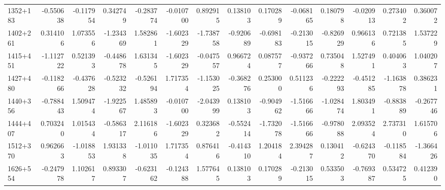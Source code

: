 \begin{tabular}{lrrrrrrrrrrrrr}
 1352+183 &  -0.550638 & -0.117954 &        0.342749 &     -0.283774 &     -0.010700 &       0.892915 &      0.138103 &   0.170289 &    -0.068165 &     0.180798 &     -0.020913 &    0.273402 &       0.360072 \\
 1402+261 &   0.314106 &  1.073556 &       -1.234369 &      1.582861 &     -1.602329 &      -1.738758 &     -0.920689 &  -0.698183 &    -0.213015 &    -0.826929 &      0.966136 &    0.721385 &       1.537229 \\
 1415+451 &  -1.112722 &  0.521393 &       -0.448678 &      1.631345 &     -1.602329 &      -0.047557 &      0.966724 &   0.087577 &    -0.937266 &     0.735048 &      1.527491 &    0.404063 &       1.040207 \\
 1427+480 &  -0.118266 & -0.437628 &       -0.523232 &     -0.526194 &      1.717354 &      -1.153025 &     -0.368276 &   0.253000 &     0.511236 &    -0.222293 &     -0.451285 &   -1.163878 &       0.386231 \\
 1440+356 &  -0.788443 &  1.509474 &       -1.922567 &      1.485893 &     -0.010700 &      -2.043999 &      0.138103 &  -0.904962 &    -1.516666 &    -1.028474 &      1.803491 &   -0.883889 &      -0.267746 \\
 1444+407 &   0.703240 &  1.015434 &       -0.586317 &      2.116186 &     -1.602329 &       0.323682 &     -0.552414 &  -1.732078 &    -1.516666 &    -0.978088 &      2.093524 &    2.737310 &       1.615706 \\
 1512+370 &   0.962663 & -1.018853 &        1.931338 &     -1.011035 &      1.717354 &       0.876416 &     -0.414310 &   1.204184 &     2.394287 &     0.130412 &     -0.624370 &   -0.118584 &      -1.366426 \\
 1626+554 &  -0.247978 &  1.102617 &        0.893307 &     -0.623162 &     -0.124388 &       1.577645 &      0.138103 &   0.170289 &    -0.213015 &     0.533503 &     -0.769387 &    0.534725 &       0.412390 \\
\bottomrule
\end{tabular}
